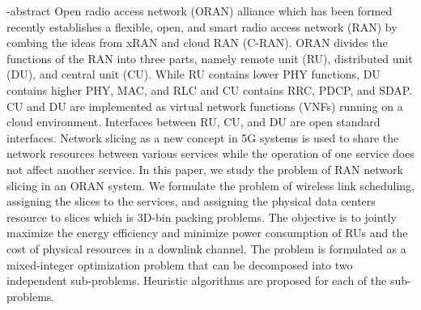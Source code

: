 
\en-abstract{
Open radio access network (ORAN) alliance which has been formed recently establishes a flexible,  open, and smart radio access network (RAN) by combing the ideas from xRAN and cloud RAN (C-RAN). ORAN divides the functions of the RAN into three parts, namely remote unit (RU), distributed unit (DU), and central unit (CU). While RU contains lower PHY functions, DU contains higher PHY, MAC, and RLC and CU contains RRC, PDCP, and SDAP. CU and DU are implemented as virtual network functions (VNFs) running on a cloud environment. Interfaces between RU, CU, and DU are open standard interfaces. Network slicing as a new concept in 5G systems is used to share the network resources between various services while the operation of one service does not affect another service. In this paper, we study the problem of RAN network slicing in an ORAN system.  We formulate the problem of wireless link scheduling, assigning the slices to the services, and assigning the physical data centers resource to slices which is 3D-bin packing problems. The objective is to jointly maximize the energy efficiency and minimize power consumption of RUs and the cost of physical resources in a downlink channel. The problem is formulated as a mixed-integer optimization problem that can be decomposed into two independent sub-problems. Heuristic algorithms are proposed for each of the sub-problems.
}
